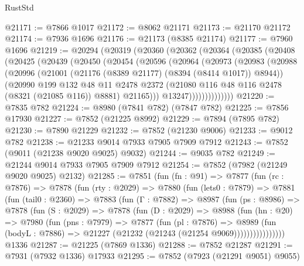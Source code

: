 \begin{lexlean}{RustStd}
\begin{coremodule}
@21171 := @7866 @1017
@21172 := @8062 @21171
@21173 := @21170 @21172
@21174 := @7936 @1696
@21176 := @21173 (@8385 @21174)
@21177 := @7960 @1696
@21219 := @20294
    (@20319
      (@20360
        (@20362
          (@20364
            (@20385
              (@20408
                (@20425
                  (@20439
                    (@20450
                      (@20454
                        (@20596
                          (@20964
                            (@20973
                              (@20983
                                (@20988
                                  (@20996
                                    (@21001 (@21176 (@8389 @21177) (@8394 (@8414 @1017)) @8944))
                                    (@20990
                                      @199
                                      @132
                                      @48
                                      @11
                                      @2478
                                      @2372
                                      (@21080 @116 @48 @116 @2478 (@8321 (@21085 @116)) @8881)
                                      @21165)))
                                @13247))))))))))))))
@21220 := @7835 @782
@21224 := @8980 (@7841 @782) (@7847 @782)
@21225 := @7856 @17930
@21227 := @7852 (@21225 @8992)
@21229 := @7894 (@7895 @782)
@21230 := @7890 @21229
@21232 := @7852 (@21230 @9006)
@21233 := @9012 @782
@21238 := @21233 @9014 @7933 @7905 @7909 @7912
@21243 := @7852 (@9011 (@21238 @9020 @9025) @9032)
@21244 := @9035 @782
@21249 := @21244 @9014 @7933 @7905 @7909 @7912
@21254 := @7852 (@7982 (@21249 @9020 @9025) @2132)
@21285 := @7851
    (fun (fn : @91) =>
    @7877
      (fun (rc : @7876) =>
      @7878
        (fun (rty : @2029) =>
        @7880
          (fun (lets0 : @7879) =>
          @7881
            (fun (tail0 : @2360) =>
            @7883
              (fun (Γ : @7882) =>
              @8987
                (fun (ps : @8986) =>
                @7878
                  (fun (S : @2029) =>
                  @7878
                    (fun (D : @2029) =>
                    @8988
                      (fun (hn : @20) =>
                      @7980
                        (fun (pns : @7979) =>
                        @7877
                          (fun (pl : @7876) =>
                          @8989
                            (fun (bodyL : @7886) =>
                            @21227 (@21232 (@21243 (@21254 @9069))))))))))))))))
    @1336
@21287 := @21225 (@7869 @1336)
@21288 := @7852 @21287
@21291 := @7931 (@7932 @1336) @17933
@21295 := @7852 (@7923 (@21291 @9051) @9055)

\end{coremodule}
\end{lexlean}
